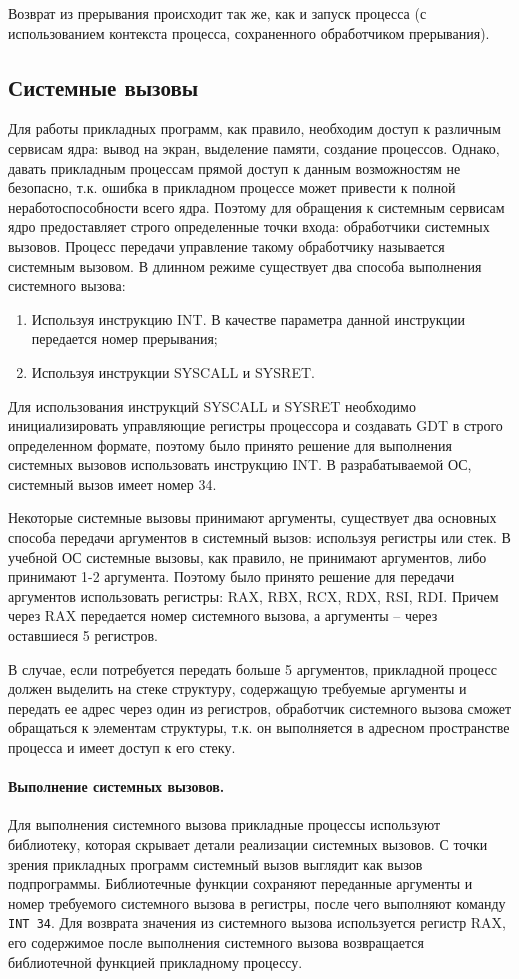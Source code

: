 Возврат из прерывания происходит так же, как и запуск процесса (с использованием контекста процесса,
сохраненного обработчиком прерывания).


\subsection{Системные вызовы}
Для работы прикладных программ, как правило, необходим доступ к различным сервисам ядра: вывод
на экран, выделение памяти, создание процессов. Однако, давать прикладным процессам прямой доступ
к данным возможностям не безопасно, т.к. ошибка в прикладном процессе может привести к полной
неработоспособности всего ядра. Поэтому для обращения к системным сервисам ядро предоставляет
строго определенные точки входа: обработчики системных вызовов. Процесс передачи управление
такому обработчику называется системным вызовом. В длинном режиме существует два способа
выполнения системного вызова:
\begin{enumerate}[1.]
\item Используя инструкцию INT. В качестве параметра данной инструкции передается номер прерывания;
\item Используя инструкции SYSCALL и SYSRET.
\end{enumerate}

Для использования инструкций SYSCALL и SYSRET необходимо инициализировать управляющие регистры
процессора и создавать GDT в строго определенном формате, поэтому было принято решение для
выполнения системных вызовов использовать инструкцию INT. В разрабатываемой ОС, системный вызов
имеет номер 34.

Некоторые системные вызовы принимают аргументы, существует два основных способа передачи
аргументов в системный вызов: используя регистры или стек. В учебной ОС системные вызовы,
как правило, не принимают аргументов, либо принимают 1-2 аргумента. Поэтому было принято
решение для передачи аргументов использовать регистры: RAX, RBX, RCX, RDX, RSI, RDI.
Причем через RAX передается номер системного вызова, а аргументы -- через оставшиеся 5 регистров.

В случае, если потребуется передать больше 5 аргументов, прикладной процесс должен выделить
на стеке структуру, содержащую требуемые аргументы и передать ее адрес через один из регистров,
обработчик системного вызова сможет обращаться к элементам структуры, т.к. он выполняется в адресном
пространстве процесса и имеет доступ к его стеку.

\paragraph{Выполнение системных вызовов.}
Для выполнения системного вызова прикладные процессы используют библиотеку, которая
скрывает детали реализации системных вызовов. С точки зрения прикладных программ системный
вызов выглядит как вызов подпрограммы. Библиотечные функции сохраняют переданные аргументы и
номер требуемого системного вызова в регистры, после чего выполняют команду \texttt{INT 34}.
Для возврата значения из системного вызова используется регистр RAX, его содержимое после
выполнения системного вызова возвращается библиотечной функцией прикладному процессу.

